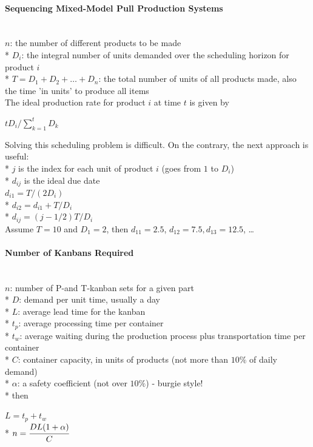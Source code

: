\documentclass[12pt]{article}
\begin{document}
\paragraph{Sequencing Mixed-Model Pull Production Systems}\mbox{}\\
$n$: the number of different products to be made\\*
$D_i$: the integral number of units demanded over the scheduling horizon for product $i$\\*
$T = D_1 + D_2 + \dots + D_n$: the total number of units of all products made, also the time 'in units' to produce all items\\
The ideal production rate for product $i$ at time $t$ is given by
\begin{center}
$tD_i/\sum_{k=1}^tD_k$
\end{center}
Solving this scheduling problem is difficult. On the contrary, the next approach is useful:\\*
$j$ is the index for each unit of product $i$ (goes from $1$ to $D_{i}$)\\*
$d_{ij}$ is the ideal due date\\
$d_{i1} = T/(2D_i)$\\*
$d_{i2} = d_{i1} + T/D_{i}$\\*
$d_{ij} = (j - 1/2)T/D_i$\\
Assume $T = 10$ and $D_1 = 2$, then $d_{11} = 2.5$, $d_{12} = 7.5, d_{13} = 12.5$, \dots
\paragraph{Number of Kanbans Required}\mbox{}\\
$n$: number of P-and T-kanban sets for a given part\\*
$D$: demand per unit time, usually a day\\*
$L$: average lead time for the kanban\\*
$t_p$: average processing time per container\\*
$t_w$: average waiting during the production process plus transportation time per container\\*
$C$: container capacity, in units of products (not more than $10\%$ of daily demand)\\*
$\alpha$: a safety coefficient (not over $10\%$) - burgie style!\\*
then
\begin{center}
$L = t_p + t_w$\\*
$n = \cfrac{DL(1+\alpha)}{C}$
\end{center}
\end{document}
